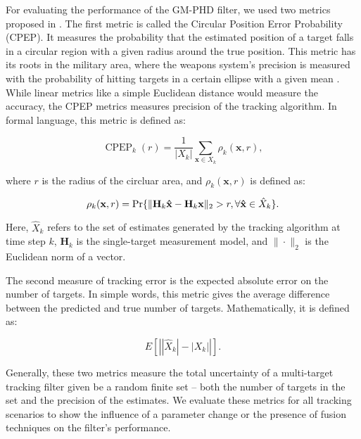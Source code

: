 For evaluating the performance of the GM-PHD filter, we used two metrics proposed in \cite{voGaussianMixtureProbability2006}. The first metric is called the Circular Position Error Probability (CPEP). It measures the probability that the estimated position of a target falls in a circular region with a given radius around the true position. This metric has its roots in the military area, where the weapons system's precision is measured with the probability of hitting targets in a certain ellipse with a given mean \cite{nelsonUseCircularError}. While linear metrics like a simple Euclidean distance would measure the accuracy, the CPEP metrics measures precision of the tracking algorithm. In formal language, this metric is defined as:

\begin{equation}
    \operatorname{CPEP}_k (r) = \frac{1}{|X_k|} \sum_{\mathbf{x} \in X_k} \rho_k(\mathbf{x}, r),
\end{equation}

\noindent where $r$ is the radius of the circluar area, and $\rho_k(\mathbf{x}, r)$ is defined as:

\begin{equation}
     \rho_k(\mathbf{x}, r) = \Pr{\| \mathbf{H}_k \mathbf{\hat{x}} - \mathbf{H}_k \mathbf{x}\|_2 > r, \forall \mathbf{\hat{x}} \in \Hat{X}_k}.
\end{equation}

\noindent Here, $\hat{X}_k$ refers to the set of estimates generated by the tracking algorithm at time step $k$, $\mathbf{H}_k$ is the single-target measurement model, and $\| \cdot \|_2$ is the Euclidean norm of a vector.

The second measure of tracking error is the expected absolute error on the number of targets. In simple words, this metric gives the average difference between the predicted and true number of targets. Mathematically, it is defined as:

\begin{equation}
    E\left[ \left||\hat{X}_k| - |X_k|\right| \right].
\end{equation}

Generally, these two metrics measure the total uncertainty of a multi-target tracking filter given be a random finite set -- both the number of targets in the set and the precision of the estimates. We evaluate these metrics for all tracking scenarios to show the influence of a parameter change or the presence of fusion techniques on the filter's performance.
